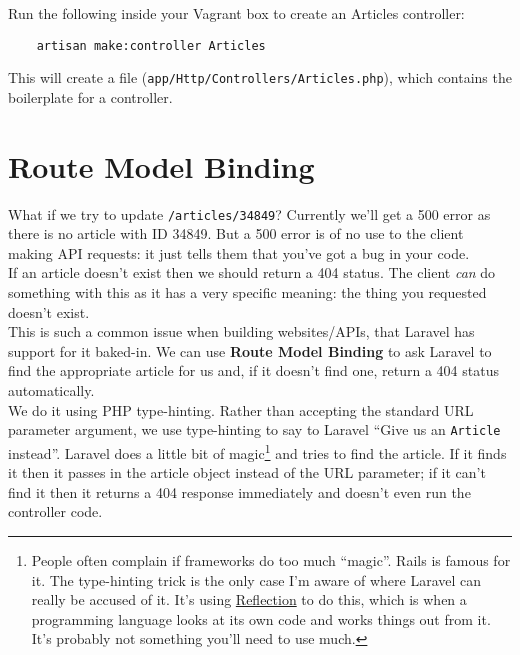Run the following inside your Vagrant box to create an Articles controller:

\begin{verbatim}
    artisan make:controller Articles
\end{verbatim}

This will create a file (\texttt{app/Http/Controllers/Articles.php}), which contains the boilerplate for a controller.



\section{Route Model Binding}

What if we try to update \texttt{/articles/34849}? Currently we'll get a 500 error as there is no article with ID 34849. But a 500 error is of no use to the client making API requests: it just tells them that you've got a bug in your code.
\\

If an article doesn't exist then we should return a 404 status. The client \textit{can} do something with this as it has a very specific meaning: the thing you requested doesn't exist.
\\

This is such a common issue when building websites/APIs, that Laravel has support for it baked-in. We can use \textbf{Route Model Binding} to ask Laravel to find the appropriate article for us and, if it doesn't find one, return a 404 status automatically.
\\

We do it using PHP type-hinting. Rather than accepting the standard URL parameter argument, we use type-hinting to say to Laravel ``Give us an \texttt{Article} instead''. Laravel does a little bit of magic\footnote{People often complain if frameworks do too much ``magic''. Rails is famous for it. The type-hinting trick is the only case I'm aware of where Laravel can really be accused of it. It's using \href{https://www.culttt.com/2014/07/02/reflection-php}{Reflection} to do this, which is when a programming language looks at its own code and works things out from it. It's probably not something you'll need to use much.} and tries to find the article. If it finds it then it passes in the article object instead of the URL parameter; if it can't find it then it returns a 404 response immediately and doesn't even run the controller code.
\\

